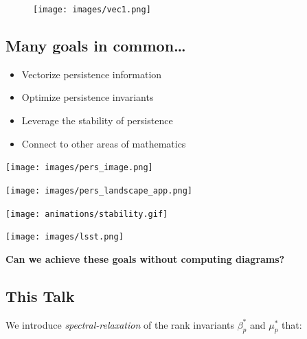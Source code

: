 \documentclass[
  letterpaper,
  DIV=11,
  numbers=noendperiod,
  oneside]{scrartcl}
\providecommand{\tightlist}{%
  \setlength{\itemsep}{0pt}\setlength{\parskip}{0pt}}\usepackage{longtable,booktabs,array}
\begin{document}
\begin{figure}

{\centering \texttt{[image: images/vec1.png]}

}

\end{figure}


\subsection{Many goals in common\ldots{}}\label{many-goals-in-common}

\begin{itemize}
\tightlist
\item
  Vectorize persistence information
\end{itemize}

\begin{itemize}
\tightlist
\item
  Optimize persistence invariants
\end{itemize}

\begin{itemize}
\tightlist
\item
  Leverage the stability of persistence
\end{itemize}

\begin{itemize}
\tightlist
\item
  Connect to other areas of mathematics
\end{itemize}

\texttt{[image: images/pers\_image.png]}

\texttt{[image: images/pers\_landscape\_app.png]}

\texttt{[image: animations/stability.gif]}

\texttt{[image: images/lsst.png]}

\textbf{Can we achieve these goals without computing diagrams?}

\subsection{This Talk}\label{this-talk}

We introduce { \emph{spectral-relaxation} } of the rank invariants
\(\beta_p^{\ast}\) and \(\mu_p^\ast\) that:
\end{document}

